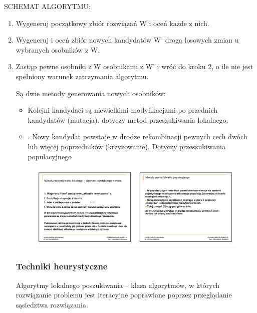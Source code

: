 \documentclass[a4paper,twoside]{report}
\begin{document}
		SCHEMAT ALGORYTMU:
		\begin{enumerate}
			\item Wygeneruj początkowy zbiór rozwiązań W i oceń każde
			z nich.
			\item  Wygeneruj i oceń zbiór nowych kandydatów W’ drogą losowych 
			zmian u wybranych osobników z W.
			\item Zastąp pewne osobniki z W osobnikami z W’ i wróć do kroku 2, o ile nie jest spełniony warunek zatrzymania algorytmu.
			
			Są dwie metody generowania nowych osobników:
			\begin{itemize}
				\item Kolejni kandydaci są niewielkimi modyfikacjami po
				przednich 
				kandydatów (mutacja). dotyczy metod przeszukiwania lokalnego.
				\item . Nowy kandydat powstaje w drodze rekombinacji pewnych cech 
				dwóch lub więcej poprzedników (krzyżowanie). Dotyczy przeszukiwania populacyjnego
			\end{itemize}
			
			\begin{figure}[H]
				\includegraphics[scale=0.3
				]{obrazy/optymalizacja/opt11.png}
			\end{figure} 
			
			\subsubsection{Techniki heurystyczne}
			
			Algorytmy lokalnego poszukiwania – klasa algorytmów, w których rozwiązanie problemu jest 
			iteracyjne poprawiane poprzez przeglądanie sąsiedztwa rozwiązania.
		\end{enumerate}
		
\end{document}
